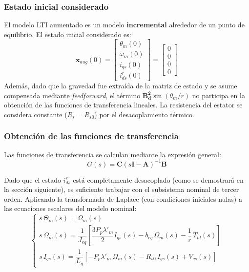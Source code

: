 \documentclass[12pt, a4paper,journal, onecolumn, compsoc]{IEEEtran}
\begin{document}
\subsubsection{Estado inicial considerado}
El modelo LTI aumentado es un modelo \textbf{incremental} alrededor de un punto de equilibrio. El estado inicial considerado es:
\begin{equation}
    \mathbf{x}_{aug}(0) = \begin{bmatrix} \theta_m(0) \\ \omega_m(0) \\ i_{qs}(0) \\ i_{ds}^r(0) \end{bmatrix} = \begin{bmatrix} 0 \\ 0 \\ 0 \\ 0 \end{bmatrix}
\end{equation}
Además, dado que la gravedad fue extraída de la matriz de estado y se asume compensada mediante \textit{feedforward}, el término $\mathbf{B_d^2}\sin(\theta_m/r)$ no participa en la obtención de las funciones de transferencia lineales. La resistencia del estator se considera constante ($R_s = R_{s0}$) por el desacoplamiento térmico.

\subsubsection{Obtención de las funciones de transferencia}
Las funciones de transferencia se calculan mediante la expresión general:
\begin{equation}
    G(s) = \mathbf{C}(s\mathbf{I} - \mathbf{A})^{-1}\mathbf{B}
\end{equation}

Dado que el estado $i_{ds}^r$ está completamente desacoplado (como se demostrará en la sección siguiente), es suficiente trabajar con el subsistema nominal de tercer orden. Aplicando la transformada de Laplace (con condiciones iniciales nulas) a las ecuaciones escalares del modelo nominal:
\begin{equation}
\begin{cases}
    s\,\Theta_m(s) = \Omega_m(s) \\[6pt]
    s\,\Omega_m(s) = \dfrac{1}{J_{eq}}\left[\dfrac{3 P_p \lambda'_m}{2} I_{qs}(s) - b_{eq}\,\Omega_m(s) - \dfrac{1}{r}\,T_{ld}(s)\right] \\[6pt]
    s\,I_{qs}(s) = \dfrac{1}{L_q}\left[-P_p \lambda'_m\,\Omega_m(s) - R_{s0}\,I_{qs}(s) + V_{qs}(s)\right]
\end{cases}
\end{equation}
\end{document}
